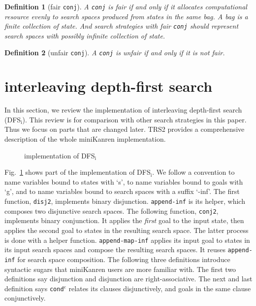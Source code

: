 \documentclass[format=acmlarge, review=true, authordraft=true]{acmart}
\newcommand{\conde}{\texttt{cond$^e$}}
\newcommand{\conj}{\texttt{conj}}
\newcommand{\DFSi }[0]{DFS$_\textrm{i}$}
\newtheorem{defn}{Definition}[section]
\begin{document}
\begin{defn}[fair \conj{}]
A \conj{} is fair if and only if it allocates computational resource evenly to 
search spaces produced from states in the same bag. A bag is a finite 
collection of state. And search strategies with fair \conj{} should represent 
search spaces with possibly infinite collection of state. 
\end{defn}

\begin{defn}[unfair \conj{}]
A \conj{} is unfair if and only if it is not fair.
\end{defn}





\section{interleaving depth-first search}

In this section, we review the implementation of interleaving depth-first 
search 
(\DFSi). This review is for comparison with other search strategies in this 
paper. Thus we focus on parts that are changed later. TRS2 
\citep{friedman_reasoned_2018} provides a comprehensive description of the 
whole miniKanren implementation.

\begin{figure}
    
    \caption{implementation of \DFSi}
    \label{DFSi}
\end{figure}

Fig.~\ref{DFSi} shows part of the implementation of \DFSi{}. We follow a
convention to name variables bound to states with `s', to name variables bound 
to goals with `g', and to name variables bound to search spaces with a suffix 
`-inf'. The first function, \texttt{disj2}, implements binary disjunction. 
\texttt{append-inf} is its helper, which composes two disjunctive search 
spaces. 
The following function, \texttt{conj2}, implements binary conjunction. It 
applies 
the \emph{first} goal to the input state, then applies the second goal to 
states in the resulting search space. The latter process is done with a helper 
function. \texttt{append-map-inf} applies its input goal to states in its input 
search spaces and compose the resulting search spaces. It reuses 
\texttt{append-inf} for search space composition. The following three 
definitions introduce syntactic sugars that miniKanren users are more familiar 
with. The first two definitions say disjunction and disjunction are 
right-associative. The next and last definition says \conde{} relates its 
clauses disjunctively, and goals in the same clause conjunctively.
\end{document}
